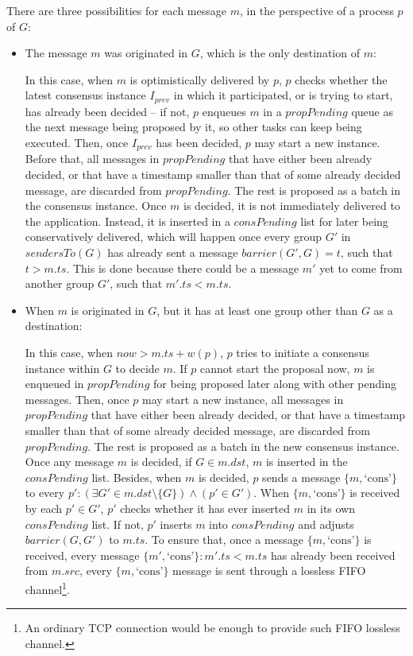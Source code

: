 \documentclass[times, 10pt]{article}
\begin{document}
There are three possibilities for each message $m$, in the perspective of a process $p$ of $G$:

\begin{itemize}
  \item The message $m$ was originated in $G$, which is the only destination of $m$:
  
  In this case, when $m$ is optimistically delivered by $p$, $p$ checks whether the latest consensus instance $I_{prev}$ in which it participated, or is trying to start, has already been decided -- if not, $p$ enqueues $m$ in a $propPending$ queue as the next message being proposed by it, so other tasks can keep being executed. Then, once $I_{prev}$ has been decided, $p$ may start a new instance. Before that, all messages in $propPending$ that have either been already decided, or that have a timestamp smaller than that of some already decided message, are discarded from $propPending$. The rest is proposed as a batch in the consensus instance. Once $m$ is decided, it is not immediately delivered to the application. Instead, it is inserted in a $consPending$ list for later being conservatively delivered, which will happen once every group $G'$ in $sendersTo(G)$ has already sent a message $barrier(G',G) = t$, such that $t > m.ts$. This is done because there could be a message $m'$ yet to come from another group $G'$, such that $m'.ts < m.ts$.

  \item When $m$ is originated in $G$, but it has at least one group other than $G$ as a destination:
  
  In this case, when $now > m.ts + w(p)$, $p$ tries to initiate a consensus instance within $G$ to decide $m$. If $p$ cannot start the proposal now, $m$ is enqueued in $propPending$ for being proposed later along with other pending messages. Then, once $p$ may start a new instance, all messages in $propPending$ that have either been already decided, or that have a timestamp smaller than that of some already decided message, are discarded from $propPending$. The rest is proposed as a batch in the new consensus instance. Once any message $m$ is decided, if $G \in m.dst$, $m$ is inserted in the $consPending$ list. Besides, when $m$ is decided, $p$ sends a message $\{m, \text{`cons'}\}$ to every \mbox{$p' : (\exists G' \in m.dst \setminus \{G\}) \wedge (p' \in G')$}. When $\{m, \text{`cons'}\}$ is received by each $p' \in G'$, $p'$ checks whether it has ever inserted $m$ in its own $consPending$ list. If not, $p'$ inserts $m$ into $consPending$ and adjusts $barrier(G, G')$ to $m.ts$. To ensure that, once a message $\{m, \text{`cons'}\}$ is received, every message \mbox{$\{m', \text{`cons'}\}:m'.ts<m.ts$} has already been received from $m.src$, every $\{m, \text{`cons'}\}$ message is sent through a lossless FIFO channel\footnote{An ordinary TCP connection would be enough to provide such FIFO lossless channel.}.
  

\end{itemize}
\end{document}
